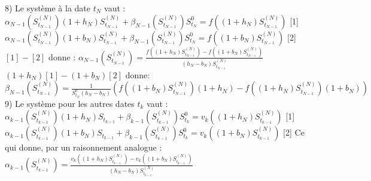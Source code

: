 \documentclass{exam}
\begin{document}
\newcommand{\espace}{\vspace{0.5cm}}

8) Le système à la date $t_N$ vaut :
\newline
\vspace{0.5cm}
$\alpha_{N-1}(S_{t_{N-1}}^{(N)})(1 + h_N)S_{t_{N-1}}^{(N)} + \beta_{N-1}(S_{t_{N-1}}^{(N)})S_{t_N}^{0} = f((1+h_N)S_{t_{N-1}}^{(N)})$ \hspace{1cm} [1]
\newline
\vspace{0.5cm}
$\alpha_{N-1}(S_{t_{N-1}}^{(N)})(1+b_N)S_{t_{N-1}}^{(N)} + \beta_{N-1}(S_{t_{N-1}}^{(N)})S_{t_N}^{0} = f((1+b_N)S_{t_{N-1}}^{(N)})$ \hspace{1cm} [2]
\newline
\vspace{0.5cm}
$[1]-[2]$ donne :
\newline
\vspace{0.5cm}
$\alpha_{N-1}(S_{t_{N-1}}^{(N)})=\frac{f((1+h_N)S_{t_{N-1}}^{(N)})-f((1+b_N)S_{t_{N-1}}^{(N)})}{(h_N-b_N)S_{t_{N-1}}^{(N)}}$
\newline
\vspace{0.5cm}
$(1+h_N)[1]-(1+b_N)[2]$ donne:
\newline
\vspace{0.5cm}
$\beta_{N-1}(S_{t_{N-1}}^{(N)})=\frac{1}{S_{t_N}^0(h_N-b_N)}(f((1+b_N)S_{t_{N-1}}^{(N)})(1+h_N)-f((1+h_N)S_{t_{N-1}}^{(N)})(1+b_N))$
\newline
\vspace{0.5cm}
9) Le système pour les autres dates $t_k$ vaut :
\newline
\vspace{0.5cm}
$\alpha_{k-1}(S_{t_{k-1}}^{(N)})(1 + h_N)S_{t_{k-1}} + \beta_{k-1}(S_{t_{k-1}}^{(N)})S_{t_k}^{0} = v_k((1+h_N)S_{t_{k-1}}^{(N)})$ \hspace{1cm} [1]
\newline
\vspace{0.5cm}
$\alpha_{k-1}(S_{t_{k-1}}^{(N)})(1+b_N)S_{t_{k-1}} + \beta_{k-1}(S_{t_{k-1}}^{(N)})S_{t_k}^{0} = v_k((1+b_N)S_{t_{k-1}}^{(N)})$ \hspace{1cm} [2]
\newline
\vspace{0.5cm}
Ce qui donne, par un raisonnement analogue : 
\newline
\vspace{0.5cm}
$\alpha_{k-1}(S_{t_{k-1}}^{(N)})=\frac{v_k((1+h_N)S_{t_{k-1}}^{(N)})-v_k((1+b_N)S_{t_{k-1}}^{(N)})}{(h_N-b_N)S_{t_{k-1}}^{(N)}}$
\newline
\end{document}
